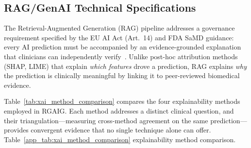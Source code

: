 \subsection{RAG/GenAI Technical Specifications}
\label{app:sec7_rag_genai}

The Retrieval-Augmented Generation (RAG) pipeline addresses a governance requirement specified by the EU AI Act (Art.~14) and FDA SaMD guidance: every AI prediction must be accompanied by an evidence-grounded explanation that clinicians can independently verify~\cite{lewis2020rag, gao2024rag}. Unlike post-hoc attribution methods (SHAP, LIME) that explain \textit{which features} drove a prediction, RAG explains \textit{why} the prediction is clinically meaningful by linking it to peer-reviewed biomedical evidence.

Table~\ref{tab:xai_method_comparison} compares the four explainability methods employed in RGAIG. Each method addresses a distinct clinical question, and their triangulation---measuring cross-method agreement on the same prediction---provides convergent evidence that no single technique alone can offer.
\noindent Table~\ref{app_tab:xai_method_comparison} explainability method comparison.

